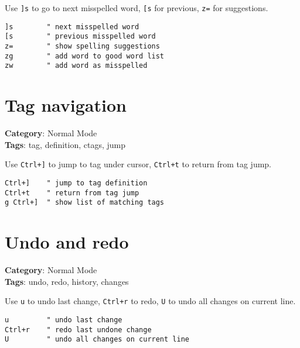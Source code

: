 {{{{{{{{{{Use {\footnotesize \Verb§]s§} to go to next misspelled word, {\footnotesize \Verb§[s§} for previous, {\footnotesize \Verb§z=§} for suggestions.

\begin{Exa*}{}
\begin{Verbatim}[fontsize=\footnotesize, breaklines, breakanywhere]
]s        " next misspelled word
[s        " previous misspelled word
z=        " show spelling suggestions
zg        " add word to good word list
zw        " add word as misspelled
\end{Verbatim}
\end{Exa*}

\section{Tag navigation}

\textbf{Category}: Normal Mode\\ \textbf{Tags}: tag, definition, ctags, jump
\vspace{0.5cm}

Use {\footnotesize \Verb§Ctrl+]§} to jump to tag under cursor, {\footnotesize \Verb§Ctrl+t§} to return from tag jump.

\begin{Exa*}{}
\begin{Verbatim}[fontsize=\footnotesize, breaklines, breakanywhere]
Ctrl+]    " jump to tag definition
Ctrl+t    " return from tag jump
g Ctrl+]  " show list of matching tags
\end{Verbatim}
\end{Exa*}

\section{Undo and redo}

\textbf{Category}: Normal Mode\\ \textbf{Tags}: undo, redo, history, changes
\vspace{0.5cm}

Use {\footnotesize \Verb§u§} to undo last change, {\footnotesize \Verb§Ctrl+r§} to redo, {\footnotesize \Verb§U§} to undo all changes on current line.

\begin{Exa*}{}
\begin{Verbatim}[fontsize=\footnotesize, breaklines, breakanywhere]
u         " undo last change
Ctrl+r    " redo last undone change
U         " undo all changes on current line
\end{Verbatim}
\end{Exa*}

}}}}}}}}}}
